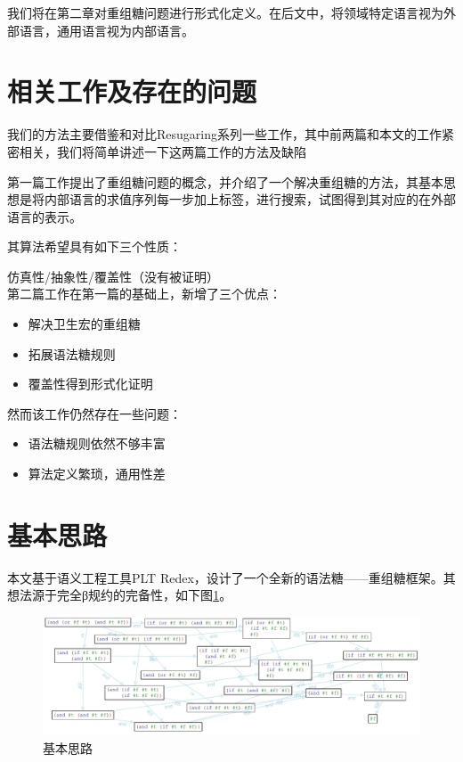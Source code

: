 我们将在第二章对重组糖问题进行形式化定义。在后文中，将领域特定语言视为外部语言，通用语言视为内部语言。

\section{相关工作及存在的问题}
我们的方法主要借鉴和对比Resugaring系列一些工作，其中前两篇和本文的工作紧密相关，我们将简单讲述一下这两篇工作的方法及缺陷

第一篇工作提出了重组糖问题的概念，并介绍了一个解决重组糖的方法，其基本思想是将内部语言的求值序列每一步加上标签，进行搜索，试图得到其对应的在外部语言的表示。

其算法希望具有如下三个性质：

仿真性/抽象性/覆盖性（没有被证明）
\\[12pt]
第二篇工作在第一篇的基础上，新增了三个优点：

\begin{itemize}
	\item 解决卫生宏的重组糖
	\item 拓展语法糖规则
	\item 覆盖性得到形式化证明
\end{itemize}

然而该工作仍然存在一些问题：
\begin{itemize}
	\item 语法糖规则依然不够丰富
	\item 算法定义繁琐，通用性差
\end{itemize}

\section{基本思路}

本文基于语义工程工具PLT Redex，设计了一个全新的语法糖——重组糖框架。其想法源于完全β规约的完备性，如下图\ref{fig:base}。

\begin{figure}[h]
	\centering
	\includegraphics[width=12cm]{images/chapter1/example.png}
	\caption{基本思路}
	\label{fig:base}
\end{figure}

